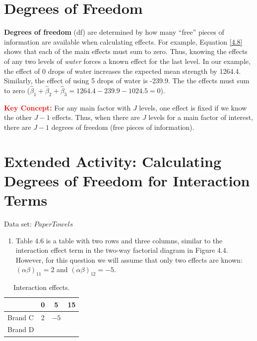 \documentclass[
]{report}
\providecommand{\tightlist}{%
  \setlength{\itemsep}{0pt}\setlength{\parskip}{0pt}}
\begin{document}
\hypertarget{degrees-of-freedom}{%
\section*{Degrees of Freedom}\label{degrees-of-freedom}}

\textbf{Degrees of freedom} (df) are determined by how many ``free'' pieces of information are available when calculating effects. For example, Equation \ref{4.8} shows that each of the main effects must sum to zero. Thus, knowing the effects of any two levels of \emph{water} forces a known effect for the last level. In our example, the effect of 0 drops of water increases the expected mean strength by 1264.4. Similarly, the effect of using 5 drops of water is -239.9. The the effects must sum to zero (\(\hat{\beta}_1 + \hat{\beta}_2 + \hat{\beta}_3 = 1264.4 - 239.9 - 1024.5 = 0\)).

\large

\textbf{\textcolor{red}{Key Concept:}}
\color{red}
For any main factor with \(J\) levels, one effect is fixed if we know the other \(J-1\) effects. Thus, when there are \(J\) levels for a main factor of interest, there are \(J-1\) degrees of freedom (free pieces of information).
\color{red}
\normalsize

\hypertarget{extended-activity-calculating-degrees-of-freedom-for-interaction-terms}{%
\section*{Extended Activity: Calculating Degrees of Freedom for Interaction Terms}\label{extended-activity-calculating-degrees-of-freedom-for-interaction-terms}}

Data set: \(PaperTowels\)

\begin{enumerate}
\def\labelenumi{\arabic{enumi}.}
\setcounter{enumi}{30}
\tightlist
\item
  Table 4.6 is a table with two rows and three columns, similar to the interaction effect term in the two-way factorial diagram in Figure 4.4. However, for this question we will assume that only two effects are known: \((\alpha\beta)_{11} = 2\) and \((\alpha\beta)_{12} = -5\).
\end{enumerate}

\begin{table}[!h]
\centering
\caption{\label{tab:tab6}Interaction effects.}
\centering
\begin{tabular}[t]{lccc}
\toprule
  & 0 & 5 & 15\\
\midrule
Brand C & 2 & $-5$ & \\
Brand D &  &  & \\
\bottomrule
\end{tabular}
\end{table}
\end{document}

